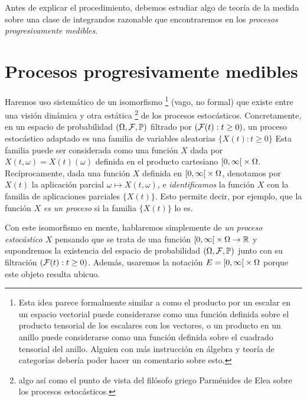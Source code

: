 Antes de explicar el procedimiento, debemos estudiar algo de teoría de la medida sobre una clase de integrandos razonable que encontraremos en los \emph{procesos progresivamente medibles}.

\section{Procesos progresivamente medibles}


Haremos uso sistemático de un isomorfismo%
\footnote{Esta idea parece formalmente similar a como el producto por un escalar en un espacio vectorial puede considerarse como una función definida sobre el producto tensorial de los escalares con los vectores, o un producto en un anillo puede considerarse como una función definida sobre el cuadrado tensorial del anillo.
Alguien con más instrucción en álgebra y teoría de categorías debería poder hacer un comentario sobre esto.}
(vago, no formal) que existe entre una visión dinámica y otra estática%
\footnote{algo así como el punto de vista del filósofo griego Parménides de Elea sobre los procesos estocásticos.}
de los procesos estocásticos.
Concretamente, en un espacio de probabilidad \((\Omega, \mathcal{F}, \mathbb{P})\) filtrado por \((\mathcal{F}(t) : t \geq 0)\), un proceso estocástico adaptado es una familia de variables aleatorias \(\{X(t) : t \geq 0\}\)
Esta familia puede ser considerada como una función \(X\) dada por \(X(t, \omega) = X(t)(\omega)\) definida en el producto cartesiano \(\interval{co}{0}{\infty} \times \Omega\).
Recíprocamente, dada una función \(X\) definida en \(\interval{co}{0}{\infty} \times \Omega\), denotamos por \(X(t)\) la aplicación parcial \(\omega \mapsto X(t, \omega)\), e \emph{identificamos} la función \(X\) con la familia de aplicaciones parciales \(\{X(t)\}\).
Esto permite decir, por ejemplo, que la función \(X\) \emph{es un proceso} si la familia \(\{X(t)\}\) lo es.

Con este isomorfismo en mente, hablaremos simplemente de \emph{un proceso estocástico \(X\)} pensando que se trata de una función \(\interval{co}{0}{\infty} \times \Omega \rightarrow \realNumbers\) y supondremos la existencia del espacio de probabilidad \((\Omega, \mathcal{F}, \mathbb{P})\) junto con su filtración \((\mathcal{F}(t) : t \geq 0)\).
Además, usaremos la notación \(E = \interval{co}{0}{\infty} \times \Omega\) porque este objeto resulta ubicuo.

